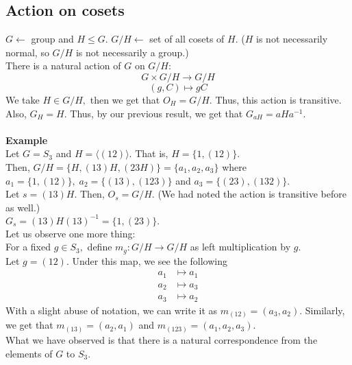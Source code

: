 \documentclass[12 pt, a4paper, toc=graduated, oneside]{article}
\theoremstyle{definition}
\begin{document}
\subsection{Action on cosets}

$G \longleftarrow$ group and $H \le G.$ $G/H \longleftarrow $ set of all cosets of $H$. ($H$ is not necessarily normal, so $G/H$ is not necessarily a group.)\\
There is a natural action of $G$ on $G/H:$
\[G \times G/H \to G/H\]
\[(g, C) \mapsto gC\]
We take $H \in G/H,$ then we get that $O_H = G/H.$ Thus, this action is transitive.\\
Also, $G_H = H.$ Thus, by our previous result, we get that $G_{aH} = aHa^{-1}.$\\~\\
\textbf{Example}\\
Let $G = S_3$ and $H = \langle  (12)\rangle.$ That is, $H = \{1, (12)\}.$\\
Then, $G/H = \{H, (13)H, (23H)\} = \{a_1, a_2, a_3\}$ where $a_1 = \{1, (12)\}, \; a_2 = \{(13), (123)\}$ and $a_3 = \{(23), (132)\}.$\\
Let $s = (13)H.$ Then, $O_s = G/H.$ (We had noted the action is transitive before as well.)\\
$G_s = (13)H(13)^{-1} = \{1, (23)\}.$\\
Let us observe one more thing:\\
For a fixed $g \in S_3,$ define $m_g : G/H \to G/H$ as left multiplication by $g.$\\
Let $g = (12).$ Under this map, we see the following
\begin{align*}
	a_1 & \mapsto a_1\\
	a_2 & \mapsto a_3\\
	a_3 & \mapsto a_2
\end{align*}
With a slight abuse of notation, we can write it as $m_{(12)} = (a_3, a_2).$
Similarly, we get that $m_{(13)} = (a_2, a_1)$ and $m_{(123)} = (a_1, a_2, a_3).$\\
What we have observed is that there is a natural correspondence from the elements of $G$ to $S_3.$

\hrulefill
\end{document}
